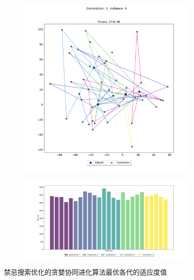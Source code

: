 \documentclass[12pt,a4paper,oneside]{ctexart}
\begin{document}
\vspace{-12pt}

\begin{figure}[htbp]
	\centering
	\begin{subfigure}[b]{0.316\textwidth}
		\centering
		\includegraphics[width=\textwidth]{fig/15.png}
	\end{subfigure}
	\hspace{2pt} %
	\begin{subfigure}[b]{0.4\textwidth}
		\centering
		\includegraphics[width=\textwidth]{fig/16.png}
	\end{subfigure}
	\caption{禁忌搜索优化的贪婪协同进化算法最优各代的适应度值}
\end{figure}
\end{document}
